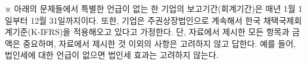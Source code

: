\begin{framedtext}
※ 아래의 문제들에서 특별한 언급이 없는 한 기업의 보고기간(회계기간)은 매년 1월 1일부터 12월 31일까지이다. 또한, 기업은 주권상장법인으로 계속해서 한국 채택국제회계기준(K-IFRS)을 적용해오고 있다고 가정한다. 단, 자료에서 제시한 모든 항목과 금액은 중요하며, 자료에서 제시한 것 이외의 사항은 고려하지 않고 답한다. 예를 들어, 법인세에 대한 언급이 없으면 법인세 효과는 고려하지 않는다. \par
\end{framedtext}
